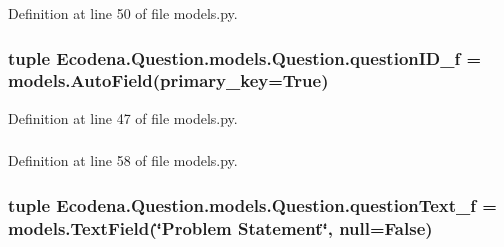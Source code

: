 Definition at line 50 of file models.py.

\hypertarget{class_ecodena_1_1_question_1_1models_1_1_question_a7bf8bc3dae949f1011c2e26226309898}{
\subsubsection[{questionID\_\-f}]{\setlength{\rightskip}{0pt plus 5cm}tuple {\bf Ecodena.Question.models.Question.questionID\_\-f} = models.AutoField(primary\_\-key=True)}}
\label{d1/d67/class_ecodena_1_1_question_1_1models_1_1_question_a7bf8bc3dae949f1011c2e26226309898}


Definition at line 47 of file models.py.

\hypertarget{class_ecodena_1_1_question_1_1models_1_1_question_a82d6ae1631802a2652e2c5ddb91a4ea7}{
\subsubsection[{questionID\_\-f}]{}}
\label{d1/d67/class_ecodena_1_1_question_1_1models_1_1_question_a82d6ae1631802a2652e2c5ddb91a4ea7}


Definition at line 58 of file models.py.

\hypertarget{class_ecodena_1_1_question_1_1models_1_1_question_a68dff1fccf327def311e574aef8c7385}{
\subsubsection[{questionText\_\-f}]{\setlength{\rightskip}{0pt plus 5cm}tuple {\bf Ecodena.Question.models.Question.questionText\_\-f} = models.TextField(\char`\"{}Problem Statement\char`\"{}, null=False)}}
\label{d1/d67/class_ecodena_1_1_question_1_1models_1_1_question_a68dff1fccf327def311e574aef8c7385}


